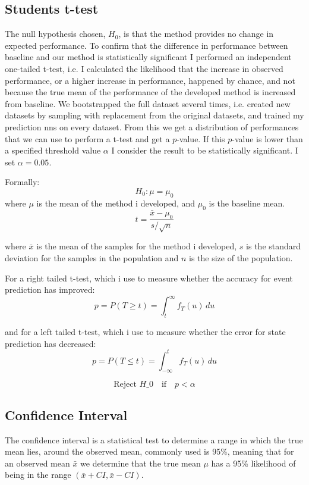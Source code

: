 \documentclass[UKenglish]{uiomasterthesis}
\begin{document}
\subsection{Students t-test}
The null hypothesis chosen, $H_0$, is that the method provides no change in expected performance. To confirm that the difference in performance between baseline and our method is statistically significant I performed an independent one-tailed t-test, i.e. I calculated the likelihood that the increase in observed performance, or a higher increase in performance, happened by chance, and not because the true mean of the performance of the developed method is increased from baseline.
We bootstrapped the full dataset several times, i.e. created new datasets by sampling with replacement from the original datasets, and trained my prediction \acp{nn} 
on every dataset. From this we get a distribution of performances that we can use to perform a t-test and get a $p$-value. If this $p$-value is lower than a specified threshold value $\alpha$ I consider the result to be statistically significant. I set $\alpha = 0.05$.

Formally: 
$$
H_0: \mu = \mu_0
$$
where $\mu$ is the mean of the method i developed, and $\mu_0$ is the baseline mean.
$$
t = \frac{\bar{x} - \mu_0}{s/\sqrt{n}}
$$

where $\bar{x}$ is the mean of the samples for the method i developed, $s$ is the standard deviation for the samples in the population and $n$ is the size of the population.

For a right tailed t-test, which i use to measure whether the accuracy for event prediction has improved:
$$p = P(T \geq t) = \int_{t}^{\infty} f_T(u)\,du$$

and for a left tailed t-test, which i use to measure whether the error for state prediction has decreased:
$$p = P(T \leq t) = \int_{-\infty}^{t} f_T(u)\,du$$

$$\text{Reject } H\_0 \quad \text{if} \quad p < \alpha$$

\subsection{Confidence Interval}
The confidence interval is a statistical test to determine a range in which the true mean lies, around the observed mean, commonly used is 95\%, meaning that for an observed mean $\bar{x}$ we determine that the true mean $\mu$ has a 95\% likelihood of being in the range $(\bar{x}+ CI, \bar{x} - CI)$\cite{ci}.
\end{document}
